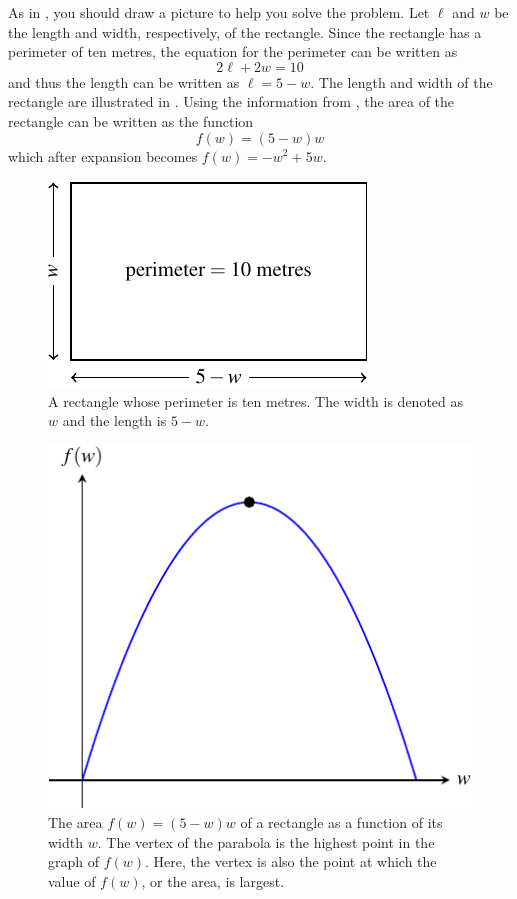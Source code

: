 \documentclass[a4paper,oneside,12pt]{article}
\begin{document}
\begin{solution}
As in , you
should draw a picture to help you solve the problem.  Let $\ell$ and
$w$ be the length and width, respectively, of the rectangle.  Since
the rectangle has a perimeter of ten metres, the equation for the
perimeter can be written as
\[
2\ell + 2w
=
10
\]
and thus the length can be written as $\ell = 5 - w$.  The length and
width of the rectangle are illustrated in
.  Using the information from
, the area of the rectangle can be
written as the function
\[
f(w)
=
(5 - w)w
\]
which after expansion becomes $f(w) = -w^2 + 5w$.

\begin{figure}[!htbp]
\centering
\includegraphics[scale=1.2]{image/09/largest-area.pdf}
\caption{%
  A rectangle whose perimeter is ten metres.  The width is denoted as
  $w$ and the length is $5 - w$.
}
\label{fig:largest_area_rectangle}
\end{figure}

\begin{figure}[!htbp]
\centering
\includegraphics[scale=1.2]{image/09/rectangle-area.pdf}
\caption{%
  The area $f(w) = (5 - w) w$ of a rectangle as a function of its
  width $w$.  The vertex of the parabola is the highest point in the
  graph of $f(w)$.  Here, the vertex is also the point at which the
  value of $f(w)$, or the area, is largest.
}
\label{fig:largest_area_graph_parabola}
\end{figure}


\end{solution}
\end{document}

